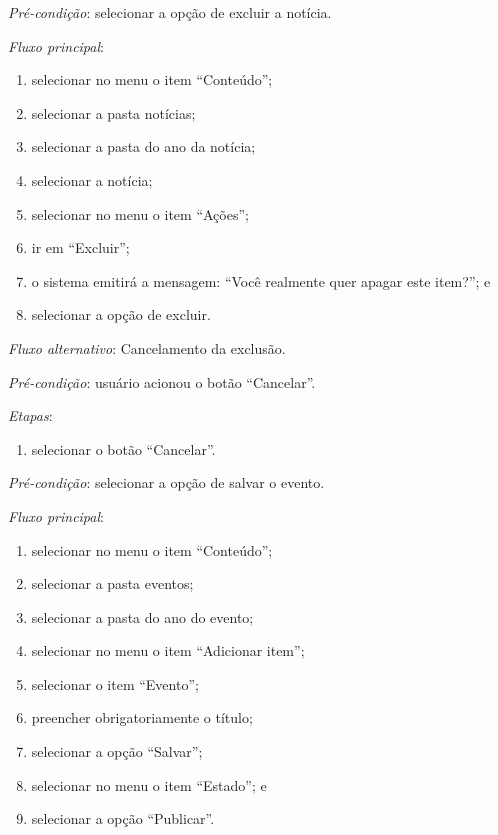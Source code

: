 \documentclass[a4paper,12pt]{article}
\begin{document}
\vspace{0.7cm}

\noindent \textit{Pré-condição}: selecionar a opção de excluir a notícia.

\noindent \textit{Fluxo principal}:

\begin{enumerate}
    \item selecionar no menu o item ``Conteúdo'';
    \item selecionar a pasta notícias;
    \item selecionar a pasta do ano da notícia;
    \item selecionar a notícia;
    \item selecionar no menu o item ``Ações'';
    \item ir em ``Excluir'';
    \item o sistema emitirá a mensagem: ``Você realmente quer apagar este item?''; e
    \item selecionar a opção de excluir.
\end{enumerate}

\noindent \textit{Fluxo alternativo}: Cancelamento da exclusão.

\noindent \textit{Pré-condição}: usuário acionou o botão ``Cancelar''.

\noindent \textit{Etapas}:

\begin{enumerate}
    \item selecionar o botão ``Cancelar''.
\end{enumerate}


\vspace{0.7cm}

\noindent \textit{Pré-condição}: selecionar a opção de salvar o evento.

\noindent \textit{Fluxo principal}:

\begin{enumerate}
    \item selecionar no menu o item ``Conteúdo'';
    \item selecionar a pasta eventos;
    \item selecionar a pasta do ano do evento;
    \item selecionar no menu o item ``Adicionar item'';
    \item selecionar o item ``Evento'';
    \item preencher obrigatoriamente o título;
    \item selecionar a opção ``Salvar'';
    \item selecionar no menu o item ``Estado''; e
    \item selecionar a opção ``Publicar''.
\end{enumerate}
\end{document}
